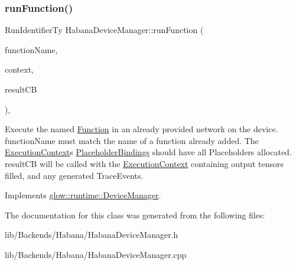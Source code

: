 \subsubsection{\texorpdfstring{run\+Function()}{runFunction()}}
{\footnotesize\ttfamily Run\+Identifier\+Ty Habana\+Device\+Manager\+::run\+Function (\begin{DoxyParamCaption}\item[{std\+::string}]{function\+Name,  }\item[{std\+::unique\+\_\+ptr$<$ \hyperlink{classglow_1_1_execution_context}{Execution\+Context} $>$}]{context,  }\item[{runtime\+::\+Result\+C\+B\+Ty}]{result\+CB }\end{DoxyParamCaption})\hspace{0.3cm}{\ttfamily [override]}, {\ttfamily [virtual]}}

Execute the named \hyperlink{classglow_1_1_function}{Function} in an already provided network on the device. function\+Name must match the name of a function already added. The \hyperlink{classglow_1_1_execution_context}{Execution\+Context}\textquotesingle{}s \hyperlink{classglow_1_1_placeholder_bindings}{Placeholder\+Bindings} should have all Placeholders allocated. result\+CB will be called with the \hyperlink{classglow_1_1_execution_context}{Execution\+Context} containing output tensors filled, and any generated Trace\+Events. 

Implements \hyperlink{classglow_1_1runtime_1_1_device_manager_ac182cdf6ed9f6903c11fa71c0446d1f7}{glow\+::runtime\+::\+Device\+Manager}.



The documentation for this class was generated from the following files\+:\begin{DoxyCompactItemize}
\item 
lib/\+Backends/\+Habana/Habana\+Device\+Manager.\+h\item 
lib/\+Backends/\+Habana/Habana\+Device\+Manager.\+cpp\end{DoxyCompactItemize}
